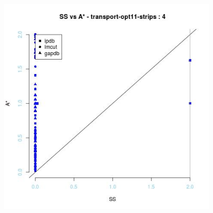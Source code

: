 \begin{figure}[!htb]
\endminipage\hfill
{}
  \includegraphics[width=\linewidth]{images/transport-opt11-strips} 
\endminipage\hfill


\end{figure}
